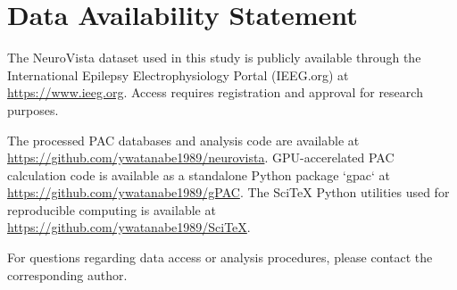 
\section*{Data Availability Statement}

The NeuroVista dataset used in this study is publicly available through the International Epilepsy Electrophysiology Portal (IEEG.org) at \url{https://www.ieeg.org}. Access requires registration and approval for research purposes. 

The processed PAC databases and analysis code are available at \url{https://github.com/ywatanabe1989/neurovista}. GPU-accerelated PAC calculation code is available as a standalone Python package `gpac` at \url{https://github.com/ywatanabe1989/gPAC}. The SciTeX Python utilities used for reproducible computing is available at \url{https://github.com/ywatanabe1989/SciTeX}.

For questions regarding data access or analysis procedures, please contact the corresponding author.

\label{data and code availability}

